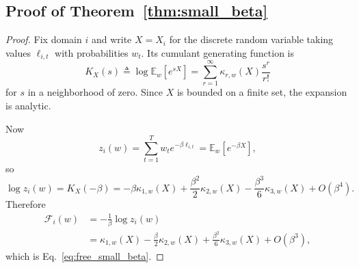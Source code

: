 \documentclass{article}
\newcommand{\EE}{\mathbb{E}}
\newcommand{\free}{\mathcal{F}}
\begin{document}
\subsection{Proof of Theorem~\ref{thm:small_beta}}

\begin{proof}
Fix domain \(i\) and write \(X=X_i\) for the discrete random variable taking values \(\ell_{i,t}\) with probabilities \(w_t\). Its cumulant generating function is
\begin{equation}
    K_X(s) \triangleq \log \EE_w[e^{sX}] = \sum_{r=1}^{\infty} \kappa_{r,w}(X)\frac{s^r}{r!}
\end{equation}
for \(s\) in a neighborhood of zero. Since \(X\) is bounded on a finite set, the expansion is analytic.

Now
\begin{equation}
    z_i(w)=\sum_{t=1}^{T} w_t e^{-\beta \ell_{i,t}} = \EE_w[e^{-\beta X}],
\end{equation}
so
\begin{equation}
    \log z_i(w)=K_X(-\beta)
    =
    -\beta \kappa_{1,w}(X)
    + \frac{\beta^2}{2}\kappa_{2,w}(X)
    - \frac{\beta^3}{6}\kappa_{3,w}(X)
    + O(\beta^4).
\end{equation}
Therefore
\begin{align}
    \free_i(w)
    &=
    -\frac{1}{\beta}\log z_i(w) \\
    &=
    \kappa_{1,w}(X)
    - \frac{\beta}{2}\kappa_{2,w}(X)
    + \frac{\beta^2}{6}\kappa_{3,w}(X)
    + O(\beta^3),
\end{align}
which is Eq.~\eqref{eq:free_small_beta}.


\end{proof}
\end{document}
